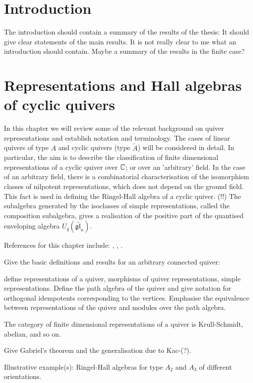 \documentclass[a4paper, 11pt]{report}
\begin{document}
\maketitle

\tableofcontents

\chapter{Introduction}

{\color{blue} The introduction should contain a summary of the results of the thesis: It should give clear statements of the main results. It is not really clear to me what an introduction should contain. Maybe a summary of the results in the finite case?}

\chapter{Representations and Hall algebras of cyclic quivers}

In this chapter we will review some of the relevant background on quiver representations and establish notation and terminology. The cases of linear quivers of type $A$ and cyclic quivers (type $\tilde{A}$) will be considered in detail. In particular, the aim is to describe the classification of finite dimensional representations of a cyclic quiver over $\mathbb{C}$; or over an 'arbitrary' field. In the case of an arbitrary field, there is a combinatorial characterisation of the isomorphism classes of nilpotent representations, which does not depend on the ground field. This fact is used in defining the Ringel-Hall algebra of a cyclic quiver. (!!) The subalgebra generated by the isoclasses of simple representations, called the composition subalgebra, gives a realisation of the positive part of the quantised enveloping algebra $U_q(\tilde{\mathfrak{gl}_n})$.

References for this chapter include: \cite{hubery04}, \cite{hubery07}, \cite{deng15}.

{\color{gray}
Give the basic definitions and results for an arbitrary connected quiver:

define representations of a quiver, morphisms of quiver representations, simple representations. Define the path algebra of the quiver and give notation for orthogonal idempotents corresponding to the vertices. Emphasise the equivalence between representations of the quiver and modules over the path algebra.

The category of finite dimensional representations of a quiver is Krull-Schmidt, abelian, and so on.

Give Gabriel's theorem and the generalisation due to Kac-(?).

Illustrative example(s): Ringel-Hall algebras for type $A_2$ and $A_3$ of different orientations.}
\end{document}
